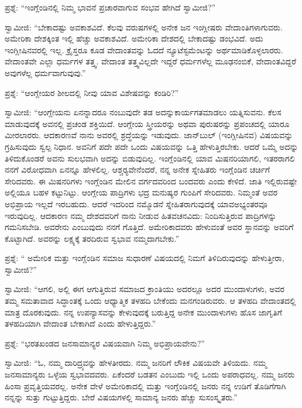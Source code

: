  ಪ್ರಶ್ನೆ: “ಇಂಗ್ಲೆಂಡಿನಲ್ಲಿ ನಿಮ್ಮ ಭಾವನೆ ಪ್ರಚಾರವಾಗುವ ಸಂಭವ ಹೇಗಿದೆ ಸ್ವಾಮೀಜಿ?” 

 ಸ್ವಾಮೀಜಿ: “ಬೇಕಾದಷ್ಟು ಅವಕಾಶವಿದೆ. ಕೆಲವು ವರುಷಗಳಲ್ಲಿ ಅನೇಕ ಜನ ಇಂಗ್ಲೀಷರು ವೇದಾಂತಿಗಳಾಗುವರು. ಅಮೇರಿಕಾ ದೇಶಕ್ಕಿಂತ ಇಲ್ಲಿ ಹೆಚ್ಚು ಅವಕಾಶವಿದೆ. ಅಮೇರಿಕಾ ದೇಶದಲ್ಲಿ ಬೇಕಾದಷ್ಟು ಡಂಭವಿದೆ. ಅದು ಇಂಗ್ಲೀಷಿನವರಲ್ಲಿ ಇಲ್ಲ. ಕ್ರೈಸ್ತರೂ ಕೂಡ ವೇದಾಂತವನ್ನು ಓದದೆ ನ್ಯೂಟೆಸ್ಟಮೆಂಟನ್ನು ಅರ್ಥಮಾಡಿಕೊಳ್ಳಲಾರರು. ವೇದಾಂತವೇ ಎಲ್ಲಾ ಧರ್ಮಗಳ ತತ್ತ್ವ. ವೇದಾಂತ ತತ್ತ್ವವಿಲ್ಲದೇ ಇದ್ದರೆ ಧರ್ಮಗಳೆಲ್ಲ ಮೂಢನಂಬಿಕೆ, ವೇದಾಂತವಿದ್ದರೆ ಅವುಗಳೆಲ್ಲ ಧರ್ಮವಾಗುವುವು.” 

 ಪ್ರಶ್ನೆ: “ಆಂಗ್ಲೇಯರ ಶೀಲದಲ್ಲಿ ನೀವು ಯಾವ ವಿಶೇಷವನ್ನು ಕಂಡಿರಿ?” 

 ಸ್ವಾಮೀಜಿ: “ಆಂಗ್ಲೇಯನು ಏನನ್ನಾದರೂ ನಂಬುವುದೇ ತಡ ಅದನ್ನು\break ಕಾರ್ಯಗತಮಾಡಲು ಯತ್ನಿಸುವನು. ಕೆಲಸ ಮಾಡುವುದಕ್ಕೆ ಅವನಲ್ಲಿ ಪ್ರಚಂಡ ಶಕ್ತಿಯಿದೆ. ಆಂಗ್ಲೇಯ ಸ್ತ್ರೀಯರನ್ನು ಅಥವಾ ಪುರುಷರನ್ನು ಪ್ರಪಂಚದಲ್ಲಿ ಯಾರೂ ಮೀರಲಾರರು. ಆದಕಾರಣವೆ ನಾನು ಅವರಲ್ಲಿ ಶ್ರದ್ಧೆಯನ್ನು ಇಡುವುದು. ಜಾನ್‌ಬುಲ್ (ಇಂಗ್ಲೀಷಿನವ) ವಿಷಯವನ್ನು ಗ್ರಹಿಸುವುದು ಸ್ವಲ್ಪ ನಿಧಾನ. ಅವನಿಗೆ ಪದೇ ಪದೇ ಒಂದು ವಿಷಯವನ್ನು ಒತ್ತಿ ಹೇಳುತ್ತಿರಬೇಕು. ಆದರೆ ಒಮ್ಮೆ ಅದನ್ನು ತಿಳಿದುಕೊಂಡರೆ ಅವನು ಸುಲಭವಾಗಿ ಅದನ್ನು ಬಿಡುವುದಿಲ್ಲ. ಇಂಗ್ಲೆಂಡಿನಲ್ಲಿ ಯಾವ ಮಿಷನರಿಯಾಗಲಿ, ಇತರರಾಗಲಿ ನನಗೆ ವಿರೋಧವಾಗಿ ಏನನ್ನೂ ಹೇಳಲಿಲ್ಲ. ಆಶ್ಚರ‍್ಯವೇನೆಂದರೆ, ನನ್ನ ಅನೇಕ ಸ್ನೇಹಿತರು ಇಂಗ್ಲೆಂಡಿನ ಚರ್ಚಿಗೆ ಸೇರಿದವರು. ಈ ಮಿಷನರಿಗಳು ಇಂಗ್ಲೆಂಡಿನ ಮೇಲಿನ ವರ್ಗದವರಿಂದ ಬಂದವರು ಎಂದು ಕೇಳಿದೆ. ಜಾತಿ ಇಲ್ಲಿರುವಷ್ಟೇ ಅಲ್ಲಿಯೂ ಬಹಳ ಕಟ್ಟುನಿಟ್ಟು. ಆಂಗ್ಲೇಯ ಪಾದ್ರಿಗಳು ಭದ್ರ ಮನುಷ್ಯರ ಗುಂಪಿಗೆ ಸೇರಿದವರು. ನಿಮ್ಮಂತೆ ಅವರ ಅಭಿಪ್ರಾಯ ಇಲ್ಲದೆ ಇರಬಹುದು. ಆದರೆ ಇದರಿಂದ ನಮ್ಮೊಡನೆ ಸ್ನೇಹಿತರಾಗುವುದಕ್ಕೆ ಯಾವ\break ಅಭ್ಯಂತರವೂ ಇರುವುದಿಲ್ಲ. ಆದಕಾರಣ ನಮ್ಮ ದೇಶದವರಿಗೆ ನಾನು ನೀಡುವ ಹಿತವಚನವಿದು: ನಿಂದಿಸುತ್ತಿರುವ ಪಾದ್ರಿಗಳನ್ನು ಗಮನಿಸಬೇಡಿ. ಅವರೇನು ಎಂಬುವುದು ನನಗೆ ಗೊತ್ತಿದೆ. ಅಮೇರಿಕಾದವರು ಹೇಳುವಂತೆ ಅವರ ಸ್ಥಾನವನ್ನು ಅವರಿಗೆ ಕೊಟ್ಟಾಗಿದೆ. ಅವರನ್ನು ಲಕ್ಷ್ಯಕ್ಕೆ ತರದಿರುವ ಸ್ವಭಾವ ನಮ್ಮದಾಗಬೇಕು.” 

 ಪ್ರಶ್ನೆ: “ ಅಮೇರಿಕ ಮತ್ತು ಇಂಗ್ಲೆಂಡಿನ ಸಮಾಜ ಸುಧಾರಣೆ ವಿಷಯದಲ್ಲಿ ನಿಮಗೆ ತಿಳಿದಿರುವುದನ್ನು ಹೇಳುತ್ತೀರಾ, ಸ್ವಾಮೀಜಿ?” 

 ಸ್ವಾಮೀಜಿ: “ಆಗಲಿ, ಅಲ್ಲಿ ಈಗ ಆಗುತ್ತಿರುವ ಸಮಾಜದ ಕ್ರಾಂತಿಯು ಅದರಲ್ಲೂ ಅದರ ಮುಂದಾಳುಗಳು, ಅವರ ತಮ್ಮ ಸಮತಾವಾದ ಸಿದ್ಧಾಂತಕ್ಕೆ ಒಂದು ಆಧ್ಯಾತ್ಮಿಕ ತಳಹದಿ ಬೇಕೆಂದು ಮನಗಂಡಿರುವರು. ಆ ತಳಹದಿ ವೇದಾಂತದಲ್ಲಿ ಮಾತ್ರ ದೊರಕುವುದು. ನನ್ನ ಉಪನ್ಯಾಸವನ್ನು ಕೇಳುವುದಕ್ಕೆ ಬರುತ್ತಿದ್ದ ಅನೇಕ ಮುಂದಾಳುಗಳು ಹೊಸ ಜಾಗೃತಿಗೆ ತಳಹದಿಯಾಗಿ ವೇದಾಂತ ಬೇಕಾಗಿದೆ ಎಂದು ಹೇಳುತ್ತಿದ್ದರು.” 

 ಪ್ರಶ್ನೆ: “ಭರತಖಂಡದ ಜನಸಾಮಾನ್ಯರ ವಿಷಯವಾಗಿ ನಿಮ್ಮ ಅಭಿಪ್ರಾಯವೇನು?” 

 ಸ್ವಾಮೀಜಿ: “ಓ, ನಮ್ಮ ದಾರಿದ್ರ್ಯವನ್ನು ಹೇಳತೀರದು. ನಮ್ಮ ಜನರಿಗೆ ಲೌಕಿಕ ವಿಷಯವೇ ತಿಳಿಯದು. ನಮ್ಮ ಜನಸಾಮಾನ್ಯರು ಒಳ್ಳೆಯ ಸ್ವಭಾವದವರು. ಏಕೆಂದರೆ ಬಡತನ ಎಂಬುದು ಇಲ್ಲಿ ಒಂದು ಅಪರಾಧವಲ್ಲ. ನಮ್ಮ ಜನರು ಹಿಂಸಾ ಪ್ರವೃತ್ತಿಯವರಲ್ಲ. ಅನೇಕ ವೇಳೆ ಅಮೇರಿಕಾದಲ್ಲಿ ಮತ್ತು ಇಂಗ್ಲೆಂಡಿನಲ್ಲಿ ಜನರು ನನ್ನ ಉಡಿಗೆ ತೊಡಿಗೆಗಾಗಿ ನನ್ನನ್ನು ಸುತ್ತು ಗುಟ್ಟುತ್ತಿದ್ದರು. ಬೇರೆ ವಿಷಯಗಳಲ್ಲಿ ಸಾಮಾನ್ಯ ಜನರು ಹೆಚ್ಚು ಸುಸಂಸ್ಕೃತರು.” 

